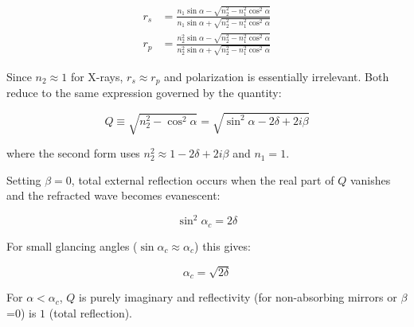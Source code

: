 \begin{align}
    r_s &= \frac{n_1 \sin\alpha - \sqrt{n_2^2 - n_1^2\cos^2\alpha}}
               {n_1 \sin\alpha + \sqrt{n_2^2 - n_1^2\cos^2\alpha}} \\[8pt]
    r_p &= \frac{n_2^2 \sin\alpha - \sqrt{n_2^2 - n_1^2\cos^2\alpha}}
               {n_2^2 \sin\alpha + \sqrt{n_2^2 - n_1^2\cos^2\alpha}}
\end{align}

\noindent
Since $n_2 \approx 1$ for X-rays, $r_s \approx r_p$ and polarization is
essentially irrelevant. Both reduce to the same expression governed by the
quantity:

\begin{equation}
    Q \equiv \sqrt{n_2^2 - \cos^2\alpha}
           = \sqrt{\sin^2\alpha - 2\delta + 2i\beta}
\end{equation}

where the second form uses $n_2^2 \approx 1 - 2\delta + 2i\beta$ and
$n_1 = 1$.

Setting $\beta = 0$, total external reflection occurs when the real part of $Q$
vanishes and the refracted wave becomes evanescent:

\begin{equation}
    \sin^2\alpha_c = 2\delta
\end{equation}

\noindent
For small glancing angles ($\sin\alpha_c \approx \alpha_c$) this gives:

\begin{equation}
    \boxed{\alpha_c = \sqrt{2\delta}}
\end{equation}

For $\alpha < \alpha_c$, $Q$ is  purely imaginary and reflectivity (for non-absorbing mirrors or $\beta$=0) is $1$ (total reflection). 

